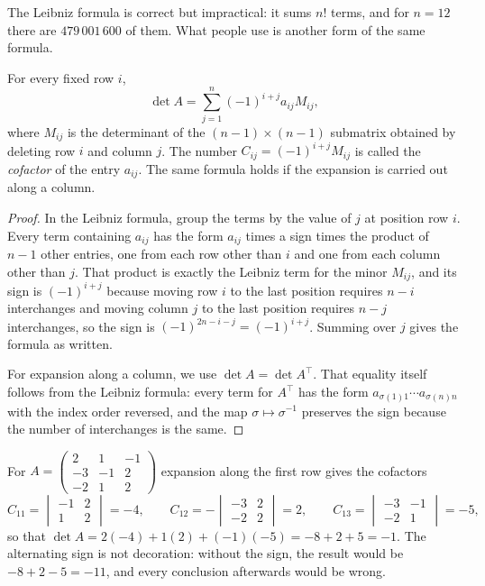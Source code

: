 The Leibniz formula is correct but impractical: it sums $n!$ terms, and for $n=12$ there are
$479\,001\,600$ of them. What people use is another form of the same formula.

\begin{akibat}
For every fixed row $i$,
\[
  \det A=\sum_{j=1}^{n}(-1)^{i+j}a_{ij}M_{ij},
\]
where $M_{ij}$ is the determinant of the $(n-1)\times(n-1)$ submatrix obtained by deleting row
$i$ and column $j$. The number $C_{ij}=(-1)^{i+j}M_{ij}$ is called the \emph{cofactor} of the
entry $a_{ij}$. The same formula holds if the expansion is carried out along a column.
\end{akibat}

\begin{proof}
In the Leibniz formula, group the terms by the value of $j$ at position row $i$. Every term
containing $a_{ij}$ has the form $a_{ij}$ times a sign times the product of $n-1$ other
entries, one from each row other than $i$ and one from each column other than $j$. That product
is exactly the Leibniz term for the minor $M_{ij}$, and its sign is $(-1)^{i+j}$ because moving
row $i$ to the last position requires $n-i$ interchanges and moving column $j$ to the last
position requires $n-j$ interchanges, so the sign is $(-1)^{2n-i-j}=(-1)^{i+j}$. Summing over
$j$ gives the formula as written.

For expansion along a column, we use $\det A=\det A^{\top}$. That equality itself follows from
the Leibniz formula: every term for $A^{\top}$ has the form
$a_{\sigma(1)1}\cdots a_{\sigma(n)n}$ with the index order reversed, and the map
$\sigma\mapsto\sigma^{-1}$ preserves the sign because the number of interchanges is the same.
\end{proof}

\begin{contoh}
For
$A=\begin{pmatrix}2&1&-1\\ -3&-1&2\\ -2&1&2\end{pmatrix}$ expansion along the first row gives the
cofactors
\[
  C_{11}=\begin{vmatrix}-1&2\\ 1&2\end{vmatrix}=-4,\qquad
  C_{12}=-\begin{vmatrix}-3&2\\ -2&2\end{vmatrix}=2,\qquad
  C_{13}=\begin{vmatrix}-3&-1\\ -2&1\end{vmatrix}=-5,
\]
so that $\det A=2(-4)+1(2)+(-1)(-5)=-8+2+5=-1$. The alternating sign is not decoration: without
the sign, the result would be $-8+2-5=-11$, and every conclusion afterwards would be wrong.
\end{contoh}

